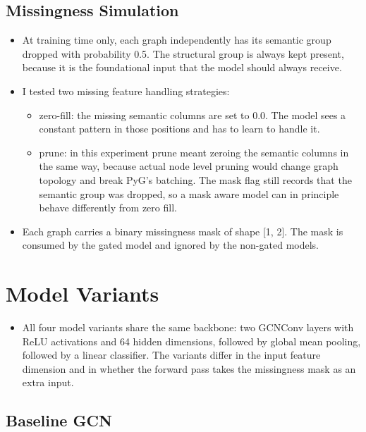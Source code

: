 \documentclass[12pt]{article}
\begin{document}
\subsection{Missingness Simulation}

\begin{itemize}
    \item At training time only, each graph independently has its semantic group dropped with probability 0.5. The structural group is always kept present, because it is the foundational input that the model should always receive.
    \item I tested two missing feature handling strategies:
        \begin{itemize}
            \item zero-fill: the missing semantic columns are set to 0.0. The model sees a constant pattern in those positions and has to learn to handle it.
            \item prune: in this experiment prune meant zeroing the semantic columns in the same way, because actual node level pruning would change graph topology and break PyG's batching. The mask flag still records that the semantic group was dropped, so a mask aware model can in principle behave differently from zero fill.
        \end{itemize}
    \item Each graph carries a binary missingness mask of shape [1, 2]. The mask is consumed by the gated model and ignored by the non-gated models.
\end{itemize}

\section{Model Variants}

\begin{itemize}
    \item All four model variants share the same backbone: two GCNConv layers with ReLU activations and 64 hidden dimensions, followed by global mean pooling, followed by a linear classifier. The variants differ in the input feature dimension and in whether the forward pass takes the missingness mask as an extra input.
\end{itemize}

\subsection{Baseline GCN}
\end{document}
